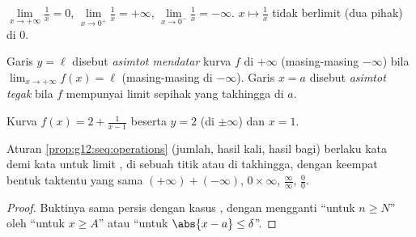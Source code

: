 \begin{example}
$\lim\limits_{x\to+\infty} \frac{1}{x} = 0$,
$\lim\limits_{x\to 0^+} \frac{1}{x} = +\infty$,
$\lim\limits_{x\to 0^-} \frac{1}{x} = -\infty$. 
$x \mapsto \frac1x$ tidak berlimit (dua pihak) di $0$.
\end{example}

\begin{definition}[Asimtot]\label{def:g12:limcont:asymptote}
Garis $y = \ell$ disebut \emph{asimtot mendatar} kurva
$f$ di $+\infty$ (masing-masing $-\infty$) bila
$\lim_{x\to+\infty} f(x) = \ell$ (masing-masing di $-\infty$). Garis $x = a$
disebut \emph{asimtot tegak} bila $f$ mempunyai limit sepihak yang takhingga di $a$.
\end{definition}

\begin{omfigure}

{\small Kurva $f(x) = 2 + \frac{1}{x-1}$ beserta 
$y = 2$ (di $\pm\infty$) dan  $x = 1$.}
\end{omfigure}

\begin{proposition}\label{prop:g12:limcont:operations}
Aturan \cref{prop:g12:seq:operations} (jumlah, hasil kali, hasil bagi) berlaku
kata demi kata untuk limit , di sebuah titik atau di takhingga, dengan
keempat bentuk taktentu yang sama $(+\infty)+(-\infty)$, $0\times\infty$,
$\frac{\infty}{\infty}$, $\frac{0}{0}$.
\end{proposition}

\begin{proof}
Buktinya sama persis dengan kasus , dengan mengganti ``untuk $n \geq N$''
oleh ``untuk $x \geq A$'' atau ``untuk $\abs{x-a} \leq \delta$''.
\end{proof}

